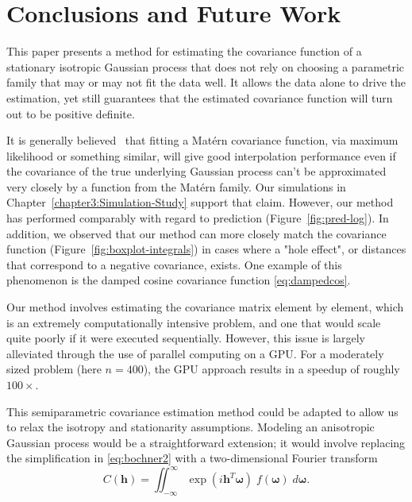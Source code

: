 \chapter{Conclusions and Future Work} \label{chapter5:Conclusions}

This paper presents a method for estimating the covariance function of a stationary isotropic Gaussian process that does not rely on choosing a parametric family that may or may not fit the data well. It allows the data alone to drive the estimation, yet still guarantees that the estimated covariance function will turn out to be positive definite.

It is generally believed~\cite{Stein1999} that fitting a Mat\'ern covariance function, via maximum likelihood or something similar, will give good interpolation performance even if the covariance of the true underlying Gaussian process can't be approximated very closely by a function from the Mat\'ern family. Our simulations in Chapter~\ref{chapter3:Simulation-Study} support that claim. However, our method has performed comparably with regard to prediction (Figure~\ref{fig:pred-log}). In addition, we observed that our method can more closely match the covariance function (Figure~\ref{fig:boxplot-integrals}) in cases where a "hole effect", or distances that correspond to a negative covariance, exists. One example of this phenomenon is the damped cosine covariance function \eqref{eq:dampedcos}.

Our method involves estimating the covariance matrix element by element, which is an extremely computationally intensive problem, and one that would scale quite poorly if it were executed sequentially. However, this issue is largely alleviated through the use of parallel computing on a GPU. For a moderately sized problem (here $n = 400$), the GPU approach results in a speedup of roughly $100\times$. %


This semiparametric covariance estimation method could be adapted to allow us to relax the isotropy and stationarity assumptions. Modeling an anisotropic Gaussian process would be a straightforward extension; it would involve replacing the simplification in \eqref{eq:bochner2} with a two-dimensional Fourier transform
\[
	C(\bm{h}) = \iint_{-\infty}^{\infty} \exp(i\bm{h}^T\bm{\omega}) \; f(\bm{\omega}) \; d\bm{\omega}.
\]

